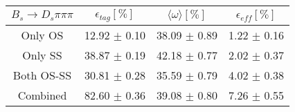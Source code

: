 \begin{tabular}{c c c c}
\hline
\hline
$ B_s \to D_s \pi \pi \pi$ & $\epsilon_{tag} [\%]$ & $\langle \omega \rangle [\%] $ & $\epsilon_{eff} [\%]$ \\
\hline
Only OS & 12.92 $\pm$ 0.10 & 38.09 $\pm$ 0.89 & 1.22 $\pm$ 0.16\\
Only SS & 38.87 $\pm$ 0.19 & 42.18 $\pm$ 0.77 & 2.02 $\pm$ 0.37\\
Both OS-SS & 30.81 $\pm$ 0.28 & 35.59 $\pm$ 0.79 & 4.02 $\pm$ 0.38\\
\hline
Combined & 82.60 $\pm$ 0.36 & 39.08 $\pm$ 0.80 & 7.26 $\pm$ 0.55\\
\hline
\hline
\end{tabular}
